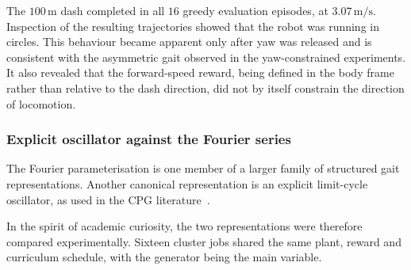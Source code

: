 The $100\,\mathrm{m}$ dash completed in all $16$ greedy evaluation episodes, at $3.07\,\mathrm{m/s}$.
Inspection of the resulting trajectories showed that the robot was running in circles.
This behaviour became apparent only after yaw was released and is consistent with the asymmetric gait observed in the yaw-constrained experiments.
It also revealed that the forward-speed reward, being defined in the body frame rather than relative to the dash direction, did not by itself constrain the direction of locomotion.


\subsubsection{Explicit oscillator against the Fourier series}

\label{sec:cpg-ab}

The Fourier parameterisation is one member of a larger family of structured gait representations.
Another canonical representation is an explicit limit-cycle oscillator, as used in the CPG literature~\cite{ijspeert2008,cpgrl2022}.

In the spirit of academic curiosity, the two representations were therefore compared experimentally.
Sixteen cluster jobs shared the same plant, reward and curriculum schedule, with the generator being the main variable.

